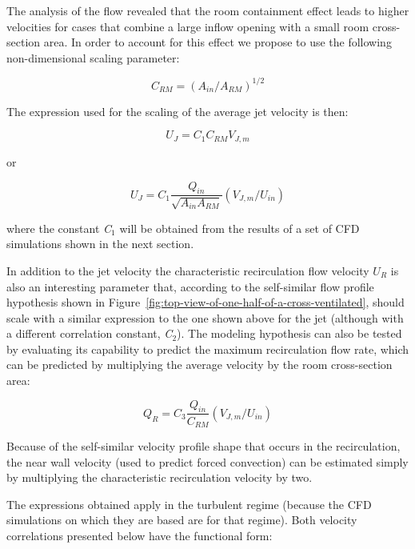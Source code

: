 The analysis of the flow revealed that the room containment effect leads to higher velocities for cases that combine a large inflow opening with a small room cross-section area. In order to account for this effect we propose to use the following non-dimensional scaling parameter:

\begin{equation}
{C_{RM}} = {\left( {{A_{in}}/{A_{RM}}} \right)^{1/2}}
\end{equation}

The expression used for the scaling of the average jet velocity is then:

\begin{equation}
{U_J} = {C_1}{C_{RM}}{V_{J,m}}
\end{equation}

or

\begin{equation}
{U_J} = {C_1}\frac{{{Q_{in}}}}{{\sqrt {{A_{in}}{A_{RM}}} }}\left( {{V_{J,m}}/{U_{in}}} \right)
\end{equation}

where the constant \emph{C}\(_{1}\) will be obtained from the results of a set of CFD simulations shown in the next section.

In addition to the jet velocity the characteristic recirculation flow velocity \({U_R}\) is also an interesting parameter that, according to the self-similar flow profile hypothesis shown in Figure~\ref{fig:top-view-of-one-half-of-a-cross-ventilated}, should scale with a similar expression to the one shown above for the jet (although with a different correlation constant, \emph{C}\(_{2}\)). The modeling hypothesis can also be tested by evaluating its capability to predict the maximum recirculation flow rate, which can be predicted by multiplying the average velocity by the room cross-section area:

\begin{equation}
{Q_R} = {C_3}\frac{{{Q_{in}}}}{{{C_{RM}}}}\left( {{V_{J,m}}/{U_{in}}} \right)
\end{equation}

Because of the self-similar velocity profile shape that occurs in the recirculation, the near wall velocity (used to predict forced convection) can be estimated simply by multiplying the characteristic recirculation velocity by two.

The expressions obtained apply in the turbulent regime (because the CFD simulations on which they are based are for that regime). Both velocity correlations presented below have the functional form:

